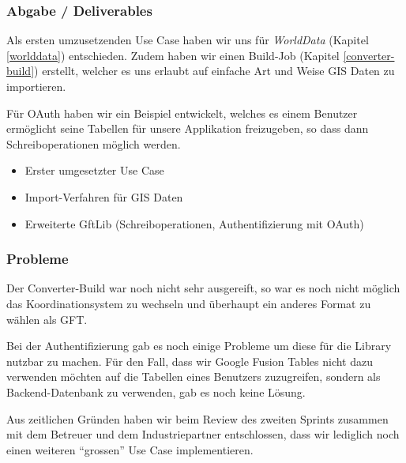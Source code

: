 \subsubsection{Abgabe / Deliverables}
Als ersten umzusetzenden Use Case haben wir uns für \emph{WorldData} (Kapitel \ref{worlddata}) entschieden. Zudem haben wir einen Build-Job (Kapitel \ref{converter-build}) erstellt, welcher es uns erlaubt auf einfache Art und Weise GIS Daten zu importieren.

Für OAuth haben wir ein Beispiel entwickelt, welches es einem Benutzer ermöglicht seine Tabellen für unsere Applikation freizugeben, so dass dann Schreiboperationen möglich werden.

\begin{itemize}
	\item Erster umgesetzter Use Case
	\item Import-Verfahren für GIS Daten
	\item Erweiterte GftLib (Schreiboperationen, Authentifizierung mit OAuth)
\end{itemize}

\subsubsection{Probleme}
Der Converter-Build war noch nicht sehr ausgereift, so war es noch nicht möglich das Koordinationsystem zu wechseln und überhaupt ein anderes Format zu wählen als GFT.

Bei der Authentifizierung gab es noch einige Probleme um diese für die Library nutzbar zu machen. Für den Fall, dass wir Google Fusion Tables nicht dazu verwenden möchten auf die Tabellen eines Benutzers zuzugreifen, sondern als Backend-Datenbank zu verwenden, gab es noch keine Lösung.

Aus zeitlichen Gründen haben wir beim Review des zweiten Sprints zusammen mit dem Betreuer und dem Industriepartner entschlossen, dass wir lediglich noch einen weiteren "`grossen"' Use Case implementieren.